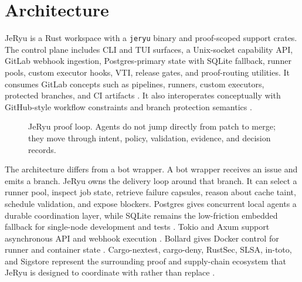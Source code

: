 \documentclass[conference]{IEEEtran}
\begin{document}
\section{Architecture}
JeRyu is a Rust workspace with a \texttt{jeryu} binary and proof-scoped support crates. The control plane includes CLI and TUI surfaces, a Unix-socket capability API, GitLab webhook ingestion, Postgres-primary state with SQLite fallback, runner pools, custom executor hooks, VTI, release gates, and proof-routing utilities. It consumes GitLab concepts such as pipelines, runners, custom executors, protected branches, and CI artifacts \cite{gitlab-ci-docs,gitlab-runners-docs,gitlab-custom-executor,gitlab-protected-branches}. It also interoperates conceptually with GitHub-style workflow constraints and branch protection semantics \cite{github-actions-docs,github-branch-protection}.

\begin{figure}[t]
\centering
{}
\caption{JeRyu proof loop. Agents do not jump directly from patch to merge; they move through intent, policy, validation, evidence, and decision records.}
\label{fig:proof-loop}
\end{figure}

The architecture differs from a bot wrapper. A bot wrapper receives an issue and emits a branch. JeRyu owns the delivery loop around that branch. It can select a runner pool, inspect job state, retrieve failure capsules, reason about cache taint, schedule validation, and expose blockers. Postgres gives concurrent local agents a durable coordination layer, while SQLite remains the low-friction embedded fallback for single-node development and tests \cite{postgresql,sqlite}. Tokio and Axum support asynchronous API and webhook execution \cite{tokio,axum}. Bollard gives Docker control for runner and container state \cite{bollard}. Cargo-nextest, cargo-deny, RustSec, SLSA, in-toto, and Sigstore represent the surrounding proof and supply-chain ecosystem that JeRyu is designed to coordinate with rather than replace \cite{rust-cargo-nextest,cargo-deny,rustsec,slsa,in-toto,sigstore}.
\end{document}
